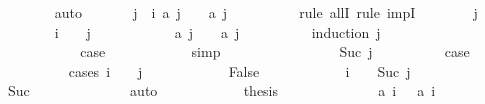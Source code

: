 \begin{isabellebody}
\ \ \ \ \ \ \isamarkupfalse%
\ auto\isanewline
\isanewline
\ \ \ \ \isamarkupfalse%
\ {\isachardoublequoteopen}{\isasymforall}\ j\ {\isasymge}\ i{\isacharplus}{}{\isachardot}\ {\isacharquery}a\ j\ {\isachargreater}\ {}\ {\isasymand}\ {\isacharquery}a\ {\isacharparenleft}j\ {\isacharplus}\ {}{\isacharparenright}\ {\isachargreater}\ {}{\isachardoublequoteclose}\isanewline
\ \ \ \ \isamarkupfalse%
\ {\isacharparenleft}rule\ allI{\isacharcomma}\ rule\ impI{\isacharparenright}\isanewline
\ \ \ \ \ \ \isamarkupfalse%
\ j\isanewline
\ \ \ \ \ \ \isamarkupfalse%
\ {\isachardoublequoteopen}i\ {\isacharplus}\ {}\ {\isasymle}\ j{\isachardoublequoteclose}\isanewline
\ \ \ \ \ \ \isamarkupfalse%
\ \isamarkupfalse%
\ {\isachardoublequoteopen}{}\ {\isacharless}\ {\isacharquery}a\ j\ {\isasymand}\ {}\ {\isacharless}\ {\isacharquery}a\ {\isacharparenleft}j\ {\isacharplus}\ {}{\isacharparenright}{\isachardoublequoteclose}\isanewline
\ \ \ \ \ \ \isamarkupfalse%
\ {\isacharparenleft}induction\ j{\isacharparenright}\isanewline
\ \ \ \ \ \ \ \ \isamarkupfalse%
\ {}\isanewline
\ \ \ \ \ \ \ \ \isamarkupfalse%
\ \isamarkupfalse%
\ {\isacharquery}case\isanewline
\ \ \ \ \ \ \ \ \ \ \isamarkupfalse%
\ simp\isanewline
\ \ \ \ \ \ \isamarkupfalse%
\isanewline
\ \ \ \ \ \ \ \ \isamarkupfalse%
\ {\isacharparenleft}Suc\ j{\isacharparenright}\isanewline
\ \ \ \ \ \ \ \ \isamarkupfalse%
\ {\isacharquery}case\isanewline
\ \ \ \ \ \ \ \ \isamarkupfalse%
\ {\isacharparenleft}cases\ {\isachardoublequoteopen}i\ {\isacharplus}\ {}\ {\isasymle}\ j{\isachardoublequoteclose}{\isacharparenright}\isanewline
\ \ \ \ \ \ \ \ \ \ \isamarkupfalse%
\ False\isanewline
\ \ \ \ \ \ \ \ \ \ \isamarkupfalse%
\ {\isachardoublequoteopen}i\ {\isacharplus}\ {}\ {\isacharequal}\ Suc\ j{\isachardoublequoteclose}\isanewline
\ \ \ \ \ \ \ \ \ \ \ \ \isamarkupfalse%
\ Suc{\isacharparenleft}{}{\isacharparenright}\isanewline
\ \ \ \ \ \ \ \ \ \ \ \ \isamarkupfalse%
\ auto\isanewline
\ \ \ \ \ \ \ \ \ \ \isamarkupfalse%
\ {\isacharquery}thesis\isanewline
\ \ \ \ \ \ \ \ \ \ \ \ \isamarkupfalse%
\ {\isacharbackquoteopen}{\isacharquery}a\ i\ {\isachargreater}\ {}{\isacharbackquoteclose}\ {\isacharbackquoteopen}{\isacharquery}a\ {\isacharparenleft}i\ {\isacharplus}\ {}{\isacharparenright}\ {\isachargreater}\ {}{\isacharbackquoteclose}\ {\isacharasterisk}\isanewline

\end{isabellebody}
